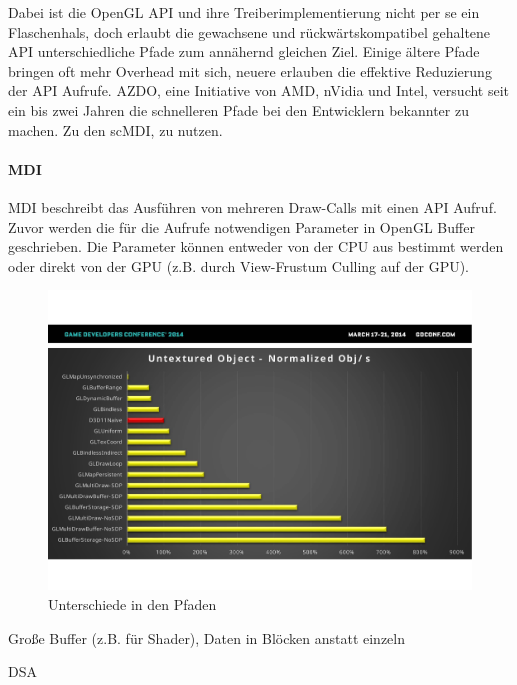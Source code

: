 Dabei ist die OpenGL API und ihre Treiberimplementierung nicht per se ein Flaschenhals, doch erlaubt die gewachsene und rückwärtskompatibel gehaltene API unterschiedliche Pfade zum annähernd gleichen Ziel. Einige ältere Pfade bringen oft mehr Overhead mit sich, neuere erlauben die effektive Reduzierung der API Aufrufe. \ac{AZDO}, eine Initiative von AMD, nVidia und Intel, versucht seit ein bis zwei Jahren die schnelleren Pfade bei den Entwicklern bekannter zu machen. Zu den sc\ac{MDI}, zu nutzen.

\paragraph{\acl{MDI}} 
\ac{MDI} beschreibt das Ausführen von mehreren Draw-Calls mit einen API Aufruf. Zuvor werden die für die Aufrufe notwendigen Parameter in OpenGL Buffer geschrieben. Die Parameter können entweder von der CPU aus bestimmt werden oder direkt von der GPU (z.B. durch View-Frustum Culling auf der GPU).

\begin{figure}
	\label{fig:opengl-pfade}
	\includegraphics[width=\textwidth]{img/opengl-spread}
	\caption{Unterschiede in den Pfaden \parencite[Seite 98]{Everitt2014}}
\end{figure}


Große Buffer (z.B. für Shader), Daten in Blöcken anstatt einzeln


\ac{DSA}

\cite{gamedevnet:glnext}
